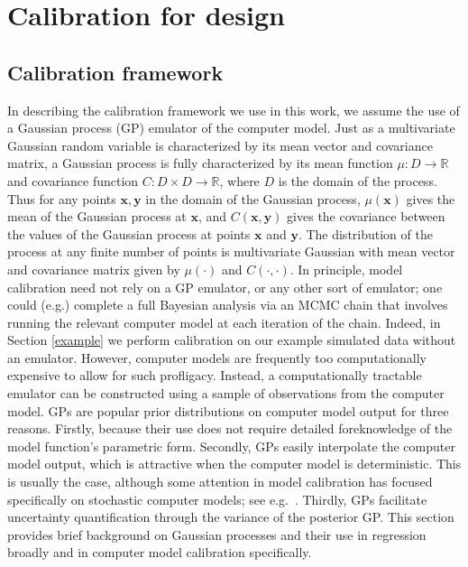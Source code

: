 \documentclass{article}
\begin{document}
\section{Calibration for design}\label{calib_for_design}
\subsection{Calibration framework} \label{calib_framework}

In describing the calibration framework we use in this work, we assume the use of a Gaussian process (GP) emulator of the computer model.
%
Just as a multivariate Gaussian random variable is characterized by its mean vector and covariance matrix, a Gaussian process is fully characterized by its mean function $\mu:D\to \mathbb R$ and covariance function $C:D\times D\to \mathbb R$, where $D$ is the domain of the process. 
%
Thus for any points $\mathbf x,\mathbf y$ in the domain of the Gaussian process, $\mu(\mathbf x)$ gives the mean of the Gaussian process at $\mathbf x$, and $C(\mathbf x, \mathbf y)$ gives the covariance between the values of the Gaussian process at points $\mathbf x$ and $\mathbf y$.
%
The distribution of the process at any finite number of points is multivariate Gaussian with mean vector and covariance matrix given by $\mu(\cdot)$ and $C(\cdot,\cdot)$.
%
In principle, model calibration
need not rely on a GP emulator, or any other sort of emulator; one could (e.g.) complete a full Bayesian analysis via an MCMC chain that involves running the relevant computer model at each iteration of the chain. 
%
Indeed, in Section \ref{example} we perform calibration on our example simulated data without an emulator.
%
However, computer models are frequently too computationally expensive to allow for such profligacy.
%
Instead, a computationally tractable emulator can be constructed using a sample of observations from the computer model. 
%
GPs are popular prior distributions on computer model output for three reasons.
%
Firstly, because their use does not require detailed foreknowledge of the model function's parametric form. 
%
Secondly, GPs easily interpolate the computer model output, which is attractive when the computer model is deterministic. 
%
This is usually the case, although some attention in model calibration has focused specifically on stochastic computer models; see e.g.\ \cite{Pratola2018}. 
%
Thirdly, GPs facilitate uncertainty quantification through the variance of the posterior GP. 
%
This section provides brief background on Gaussian processes and their use in regression broadly and in computer model calibration specifically.
\end{document}
